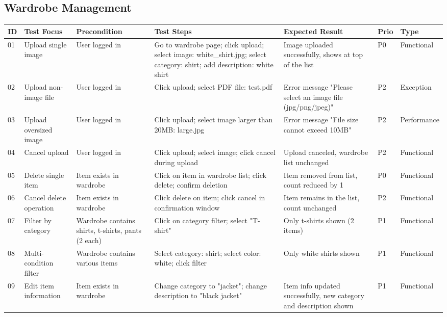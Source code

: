 \begin{appendices}
\begin{landscape}
\subsection*{Wardrobe Management}

\begin{longtable}{|p{0.8cm}|p{2.8cm}|p{3.5cm}|p{5cm}|p{5cm}|p{1.2cm}|p{1.8cm}|}
\hline
\textbf{ID} & \textbf{Test Focus} & \textbf{Precondition} & \textbf{Test Steps} & \textbf{Expected Result} & \textbf{Prio} & \textbf{Type} \\
\hline

01 & Upload single image & User logged in & Go to wardrobe page; click upload; select image: white\_shirt.jpg; select category: shirt; add description: white shirt & Image uploaded successfully, shows at top of the list & P0 & Functional \\
\hline
02 & Upload non-image file & User logged in & Click upload; select PDF file: test.pdf & Error message "Please select an image file (jpg/png/jpeg)" & P2 & Exception \\
\hline
03 & Upload oversized image & User logged in & Click upload; select image larger than 20MB: large.jpg & Error message "File size cannot exceed 10MB" & P2 & Performance \\
\hline
04 & Cancel upload & User logged in & Click upload; select image; click cancel during upload & Upload canceled, wardrobe list unchanged & P2 & Functional \\
\hline
05 & Delete single item & Item exists in wardrobe  & Click on item in wardrobe list; click delete; confirm deletion & Item removed from list, count reduced by 1 & P0 & Functional \\
\hline
06 & Cancel delete operation & Item exists in wardrobe & Click delete on item; click cancel in confirmation window & Item remains in the list, count unchanged & P2 & Functional \\
\hline
07 & Filter by category & Wardrobe contains shirts, t-shirts, pants (2 each) & Click on category filter; select "T-shirt" & Only t-shirts shown (2 items) & P1 & Functional \\
\hline
08 & Multi-condition filter & Wardrobe contains various items & Select category: shirt; select color: white; click filter & Only white shirts shown & P1 & Functional \\
\hline
09 & Edit item information & Item exists in wardrobe & Change category to "jacket"; change description to "black jacket" & Item info updated successfully, new category and description shown & P1 & Functional \\
\hline
\end{longtable}
\end{landscape}


\end{appendices}

